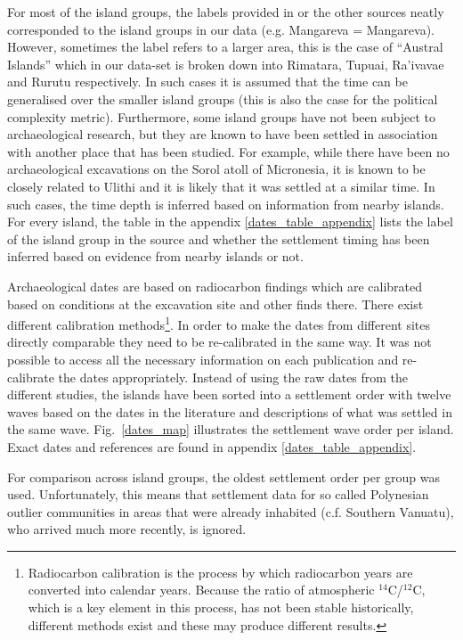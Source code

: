 \documentclass[unnumsec,webpdf,modern,medium]{oup-authoring-template}
\begin{document}
\begin{appendices}
For most of the island groups, the labels provided in \citet{rieth_cochrane_2018} or the other sources neatly corresponded to the island groups in our data (e.g. Mangareva = Mangareva). However, sometimes the label refers to a larger area, this is the case of ``Austral Islands'' which in our data-set is broken down into Rimatara, Tupuai, Ra'ivavae and Rurutu respectively. In such cases it is assumed that the time can be generalised over the smaller island groups (this is also the case for the political complexity metric). Furthermore, some island groups have not been subject to archaeological research, but they are known to have been settled in association with another place that has been studied. For example, while there have been no archaeological excavations on the Sorol atoll of Micronesia, it is known to be closely related to Ulithi \citep[23]{quackenbush1968sonsorol} and it is likely that it was settled at a similar time. In such cases, the time depth is inferred based on information from nearby islands. For every island, the table in the appendix \ref{dates_table_appendix} lists the label of the island group in the source and whether the settlement timing has been inferred based on evidence from nearby islands or not.

Archaeological dates are based on radiocarbon findings which are calibrated based on conditions at the excavation site and other finds there. There exist different calibration methods\footnote{Radiocarbon calibration is the process by which radiocarbon years are converted into calendar years. Because the ratio of atmospheric $^{14}$C/$^{12}$C, which is a key element in this process, has not been stable historically, different methods exist and these may produce different results.}. In order to make the dates from different sites directly comparable they need to be re-calibrated in the same way. It was not possible to access all the necessary information on each publication and re-calibrate the dates appropriately. Instead of using the raw dates from the different studies, the islands have been sorted into a settlement order with twelve waves based on the dates in the literature and descriptions of what was settled in the same wave. Fig.~\ref{dates_map} illustrates the settlement wave order per island. Exact dates and references are found in appendix \ref{dates_table_appendix}.

For comparison across island groups, the oldest settlement order per group was used. Unfortunately, this means that settlement data for so called Polynesian outlier communities in areas that were already inhabited (c.f. Southern Vanuatu), who arrived much more recently, is ignored.


\end{appendices}
\end{document}
